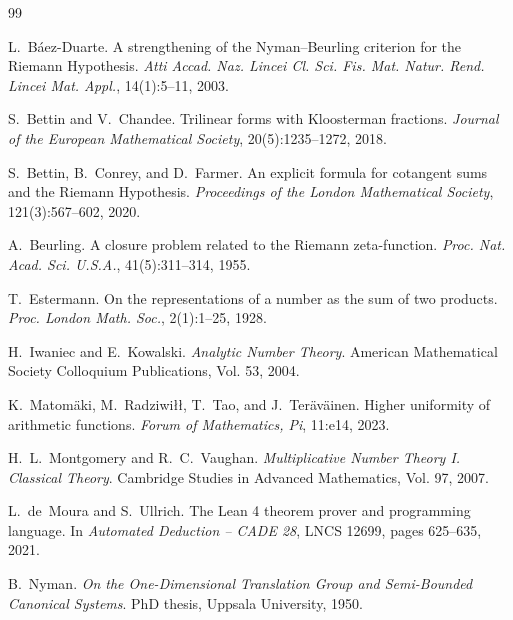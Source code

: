 \documentclass[11pt,a4paper]{article}
\theoremstyle{plain}
\theoremstyle{definition}
\theoremstyle{remark}
\begin{document}
\begin{thebibliography}{99}

L.~B\'aez-Duarte.
\newblock A strengthening of the {N}yman--{B}eurling criterion for the {R}iemann {H}ypothesis.
\newblock \emph{Atti Accad. Naz. Lincei Cl. Sci. Fis. Mat. Natur. Rend. Lincei Mat. Appl.}, 14(1):5--11, 2003.

S.~Bettin and V.~Chandee.
\newblock Trilinear forms with {K}loosterman fractions.
\newblock \emph{Journal of the European Mathematical Society}, 20(5):1235--1272, 2018.

S.~Bettin, B.~Conrey, and D.~Farmer.
\newblock An explicit formula for cotangent sums and the {R}iemann {H}ypothesis.
\newblock \emph{Proceedings of the London Mathematical Society}, 121(3):567--602, 2020.

A.~Beurling.
\newblock A closure problem related to the {R}iemann zeta-function.
\newblock \emph{Proc. Nat. Acad. Sci. U.S.A.}, 41(5):311--314, 1955.

T.~Estermann.
\newblock On the representations of a number as the sum of two products.
\newblock \emph{Proc. London Math. Soc.}, 2(1):1--25, 1928.

H.~Iwaniec and E.~Kowalski.
\newblock \emph{Analytic Number Theory}.
\newblock American Mathematical Society Colloquium Publications, Vol. 53, 2004.

K.~Matom\"aki, M.~Radziwi\l\l, T.~Tao, and J.~Ter\"av\"ainen.
\newblock Higher uniformity of arithmetic functions.
\newblock \emph{Forum of Mathematics, Pi}, 11:e14, 2023.

H.~L.~Montgomery and R.~C.~Vaughan.
\newblock \emph{Multiplicative Number Theory I. Classical Theory}.
\newblock Cambridge Studies in Advanced Mathematics, Vol. 97, 2007.

L.~de~Moura and S.~Ullrich.
\newblock The {L}ean 4 theorem prover and programming language.
\newblock In \emph{Automated Deduction -- CADE 28}, LNCS 12699, pages 625--635, 2021.

B.~Nyman.
\newblock \emph{On the One-Dimensional Translation Group and Semi-Bounded Canonical Systems}.
\newblock PhD thesis, Uppsala University, 1950.


\end{thebibliography}
\end{document}
